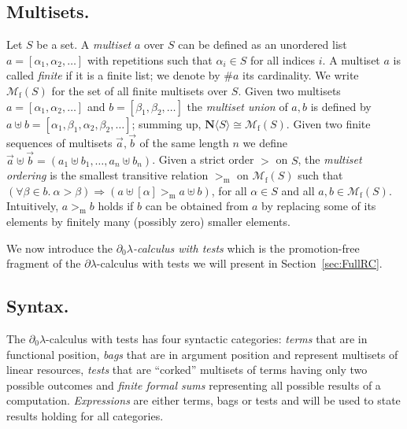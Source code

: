 \documentclass{LMCS}
\newcommand{\mge}{>_{\mathrm{m}}}
\newcommand{\nat}{\mathbf{N}}
\newcommand{\card}[1]{\# #1}
\newcommand{\dlam}{\ensuremath{\partial\lambda}}
\newcommand{\dzlam}{\ensuremath{\partial_0\lambda}}
\newcommand{\Mfin}[1]{\mathcal{M}_{\mathrm{f}}(#1)}
\newcommand{\mcup}{\uplus}
\newcommand{\seq}[1]{\vec{#1}}
\newcommand{\ga}{\alpha}
\newcommand{\gb}{\beta}
\begin{document}
\subsection{\bf Multisets.}\label{subs:msets} 
Let $S$ be a set. A \emph{multiset} $a$ over $S$ can be defined as an unordered list $a = [\ga_1,\ga_2,\ldots]$ with repetitions such that $\ga_i\in S$ for all
 indices $i$. A multiset $a$ is called \emph{finite} if it is a finite list; we denote by $\card a$ its cardinality. We write $\Mfin{S}$ for the set of all finite
 multisets over $S$. Given two multisets $a = [\ga_1,\ga_2,\ldots]$ and $b = [\gb_1,\gb_2,\ldots]$ the \emph{multiset union} of $a,b$ is defined by
 $a\mcup b = [\ga_1,\gb_1,\ga_2,\gb_2,\ldots]$; summing up, $\nat\langle S \rangle\cong\Mfin{S}$. Given two finite sequences of multisets $\seq a,\seq b$ of the same length $n$ we define
 $\seq a\mcup\seq b = (a_1\mcup b_1,\ldots,a_n\mcup b_n)$. Given a strict order $>$ on $S$, the \emph{multiset ordering} \cite[Def.~A.6.2]{terese03}
 is the smallest transitive relation $\mge$ on $\Mfin{S}$ such that $(\forall \gb \in b.\ \ga > \gb) \Rightarrow (a \mcup [\ga] \mge a \mcup b)$, for all
 $\ga \in S$ and all $a,b \in \Mfin{S}$.
Intuitively, $a \mge b$ holds if $b$ can be obtained from $a$ by replacing some of its elements by finitely many (possibly zero) smaller elements.

We now introduce the \emph{\dzlam-calculus with tests} which is the promotion-free fragment of the \dlam-calculus with tests we will present in
 Section~\ref{sec:FullRC}.

\subsection{Syntax.} The \dzlam-calculus with tests has four syntactic categories: 
\emph{terms} that are in functional position,
\emph{bags} that are in argument position and represent multisets of linear resources,
\emph{tests} that are ``corked'' multisets  of terms having only two possible outcomes
and \emph{finite formal sums} representing all possible results of a computation.
{\em Expressions} are either terms, bags or tests and will be used to state results holding for all categories.
\end{document}
